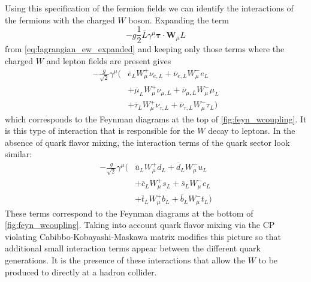 Using this specification of the fermion fields 
we can identify the interactions of the fermions with the 
charged $W$ boson.  Expanding the term 
\begin{equation}
-g \frac{1}{2} \overline{L}\gamma^{\mu}\boldsymbol{\tau} \cdot \textbf{W}_{\mu} L 
\end{equation}
from \eqn\eqref{eq:lagrangian_ew_expanded}
and keeping only those
terms where the charged $W$ and lepton fields are present gives
\begin{equation}
\begin{aligned}
-\frac{g}{\sqrt{2}}\gamma^{\mu}\Big( &
\overline{e}_L W_{\mu}^+ \nu_{e,L} +
\overline{\nu}_{e,L} W^-_{\mu} e_L \\&+
\overline{\mu}_L W_{\mu}^+ \nu_{\mu,L} +
\overline{\nu}_{\mu,L} W^-_{\mu} \mu_L \\&+
\overline{\tau}_L W_{\mu}^+ \nu_{\tau,L} +
\overline{\nu}_{\tau,L} W^-_{\mu} \tau_L \Big)
\end{aligned}
\label{eq:couplings_wleptons}
\end{equation}
which corresponds to the Feynman diagrams at the top
of \fig\ref{fig:feyn_wcoupling}. It is this
type of interaction that is responsible for the $W$ decay to leptons.
In the absence of quark flavor mixing, the interaction terms 
of the quark sector look similar:
\begin{equation}
\begin{aligned}
-\frac{g}{\sqrt{2}}\gamma^{\mu}\Big( &
\overline{u}_L W_{\mu}^+ d_{L} +
\overline{d}_{L} W^-_{\mu} u_L \\&+
\overline{c}_L W_{\mu}^+ s_{L} +
\overline{s}_{L} W^-_{\mu} c_L \\&+
\overline{t}_L W_{\mu}^+ b_{L} +
\overline{b}_{L} W^-_{\mu} t_L \Big)
\end{aligned}
\end{equation}
These terms correspond to the Feynman diagrams at the bottom
of \fig\ref{fig:feyn_wcoupling}.
Taking into account quark flavor mixing via the 
CP violating \cite{PhysRevLett.13.138} Cabibbo-Kobayashi-Maskawa
matrix \cite{Cabibbo:1963yz,Kobayashi:1973fv}
modifies this picture so that additional small interaction
terms appear between the different quark generations.
It is the presence of these interactions that allow the $W$ 
to be produced to directly at a hadron collider.


